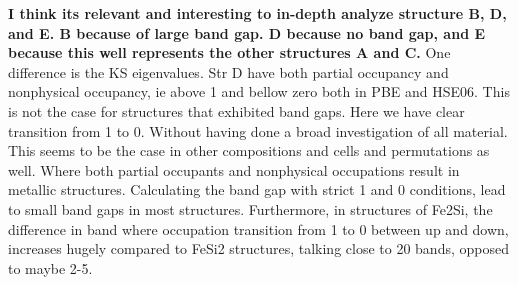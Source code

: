 \textbf{I think its relevant and interesting to in-depth analyze structure B, D, and E. B because of large band gap. D because no band gap, and E because this well represents the other structures A and C. }
One difference is the KS eigenvalues. Str D have both partial occupancy and nonphysical occupancy, ie above 1 and bellow zero both in PBE and HSE06. This is not the case for structures that exhibited band gaps. Here we have clear transition from 1 to 0. Without having done a broad investigation of all material. This seems to be the case in other compositions and cells and permutations as well. Where both partial occupants and nonphysical occupations result in metallic structures. Calculating the band gap with strict 1 and 0 conditions, lead to small band gaps in most structures. Furthermore, in structures of Fe2Si, the difference in band where occupation transition from 1 to 0 between up and down, increases hugely compared to FeSi2 structures, talking close to 20 bands, opposed to maybe 2-5. 

